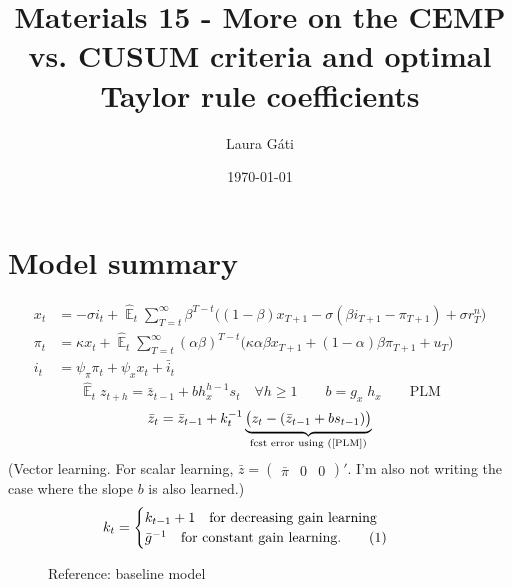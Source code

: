 \documentclass[11pt]{article}
\def \myFigPath {../figures/}
\renewcommand{\[}{\begin{equation}}
\renewcommand{\]}{\end{equation}}
\DeclareMathOperator{\E}{\mathbb{E}}
\def\myAdjustableFigScale{0.14}
\newcommand\numberthis{\addtocounter{equation}{1}\tag{\theequation}} %
\begin{document}
\linespread{1.0}

\title{Materials 15 - More on the CEMP vs. CUSUM criteria and optimal Taylor rule coefficients}
\author{Laura G\'ati} 
\date{\today}
\maketitle


\tableofcontents


\newpage
\section{Model summary}
\begin{align}
x_t &=  -\sigma i_t +\hat{\E}_t \sum_{T=t}^{\infty} \beta^{T-t }\big( (1-\beta)x_{T+1} - \sigma(\beta i_{T+1} - \pi_{T+1}) +\sigma r_T^n \big)  \label{prestons18}  \\
\pi_t &= \kappa x_t +\hat{\E}_t \sum_{T=t}^{\infty} (\alpha\beta)^{T-t }\big( \kappa \alpha \beta x_{T+1} + (1-\alpha)\beta \pi_{T+1} + u_T\big) \label{prestons19}  \\
i_t &= \psi_{\pi}\pi_t + \psi_{x} x_t  + \bar{i}_t \label{TR}
\end{align}
\begin{equation}
\hat{\E}_t z_{t+h} =  \bar{z}_{t-1} + bh_x^{h-1}s_t  \quad \forall h\geq 1 \quad \quad b = g_x\; h_x \quad \quad \text{PLM} \label{PLM}
\end{equation}
\begin{equation}
\bar{z}_{t} = \bar{z}_{t-1} +k_t^{-1}\underbrace{\big(z_{t} -(\bar{z}_{t-1}+bs_{t-1}) \big)}_{\text{fcst error using (\ref{PLM})} } 
\end{equation}
(Vector learning. For scalar learning, $\bar{z}= \begin{pmatrix} \bar{\pi} & 0 & 0\end{pmatrix}' $. I'm also not writing the case where the slope $b$ is also learned.)
 \begin{align*}
k_t & = \begin{cases} k_{t-1}+1 \quad \text{for decreasing gain learning}  \\ \bar{g}^{-1}  \quad \text{for constant gain learning.}\numberthis
\end{cases} 
\end{align*}

\begin{figure}[h!]
\caption{Reference: baseline model}
\end{figure}
\end{document}
